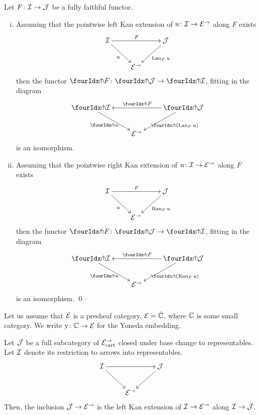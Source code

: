 \documentclass[reqno,10pt,a4paper,oneside]{amsart}
\begin{document}
\begin{proposition} Let $F \co \cal{I} \to \cal{J}$ be a fully faithful functor. 
\label{kan-extension-closure}
\begin{enumerate}[(i)]
\item Assuming that the pointwise left Kan extension of 
$u \co \cal{I} \to \catE^{\to}$ along $F$ exists
\[
\xymatrix{
  \cal{I}
  \ar[dr]_{u}
  \ar[rr]^{F}
&&
  \cal{J}
  \ar[dl]^{\Lan_F u}
\\&
  \catE^{\to}
}
\]
then the functor $\liftr{F} \co \liftr{\cal{J}} \to \liftr{\cal{I}}$,  fitting in the diagram
\[
\xymatrix{
  \liftr{\cal{I}}
  \ar[dr]_{\liftr{u}}
&&
  \liftr{\cal{J}}
  \ar[ll]_{\liftr{F}}
  \ar[dl]^{\liftr{(\Lan_F u)}}
\\&
  \catE^{\to}
}
\]
is an isomorphism.
\item Assuming that the pointwise right Kan extension of 
$u \co \cal{I} \to \catE^{\to}$ along $F$ exists
\[
\xymatrix{
  \cal{I}
  \ar[dr]_{u}
  \ar[rr]^{F}
&&
  \cal{J}
  \ar[dl]^{\Ran_F u}
\\&
  \catE^{\to}
}
\]
then the functor $\liftl{F} \co \liftl{\cal{J}} \to \liftl{\cal{I}}$, fitting in the diagram
\[
\xymatrix{
  \liftl{\cal{I}}
  \ar[dr]_{\liftl{u}}
&&
  \liftl{\cal{J}}
  \ar[ll]_{\liftl{F}}
  \ar[dl]^{\liftl{(\Ran_F u)}}
\\&
  \catE^{\to}
}
\]
is an isomorphism. \qed
\end{enumerate}
\end{proposition}









\medskip

\newcommand{\yon}{\mathrm{y}} 
Let us assume that $\catE$ is a presheaf category, \ie $\catE = \hat{\cat{C}}$, where $\catC$ is some small category. We write $\yon \co \cat{C} \to \catE$ for the Yoneda embedding.

\begin{proposition}
\label{left-kan-extension-of-representables}
Let $\cal{J}$ be a full subcategory of $\catE_{\cart}^{\to}$ closed under base change to representables.
Let $\cal{I}$ denote its restriction to arrows into representables.
\[
\xymatrix{
  \cal{I}
  \ar[rr]
  \ar[dr]
&&
  \cal{J}
  \ar[dl]
\\&
  \catE^{\to}
}
\]
Then, the inclusion $\cal{J} \to \catE^{\to}$ is the left Kan extension of $\cal{I} \to \catE^{\to}$ along $\cal{I} \to \cal{J}$.
\end{proposition}
\end{document}
